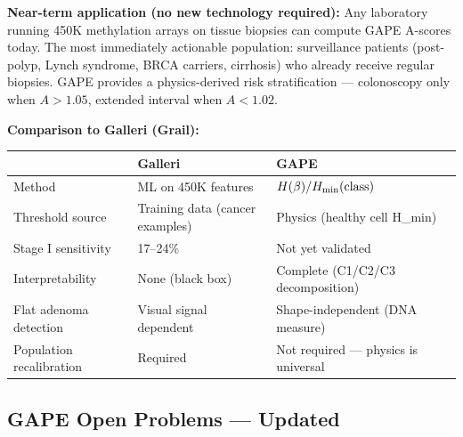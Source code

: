 \documentclass[12pt,a4paper]{article}
\begin{document}
\noindent \textbf{Near-term application (no new technology required):}
Any laboratory running 450K methylation arrays on tissue biopsies
can compute GAPE A-scores today. The most immediately actionable population:
surveillance patients (post-polyp, Lynch syndrome, BRCA carriers, cirrhosis)
who already receive regular biopsies.
GAPE provides a physics-derived risk stratification --- colonoscopy only when
$A > 1.05$, extended interval when $A < 1.02$.

\noindent \textbf{Comparison to Galleri (Grail):}

\begin{center}
\renewcommand{\arraystretch}{1.2}
\begin{tabular}{llll}
\toprule
 & \textbf{Galleri} & \textbf{GAPE} \\
\midrule
Method & ML on 450K features & $H(\beta)/H_{\rm min}(\text{class})$ \\
Threshold source & Training data (cancer examples) & Physics (healthy cell H\_min) \\
Stage I sensitivity & 17--24\% & Not yet validated \\
Interpretability & None (black box) & Complete (C1/C2/C3 decomposition) \\
Flat adenoma detection & Visual signal dependent & Shape-independent (DNA measure) \\
Population recalibration & Required & Not required --- physics is universal \\
\bottomrule
\end{tabular}
\end{center}

\subsection{GAPE Open Problems --- Updated}
\label{subsec:gape_open}
\end{document}
